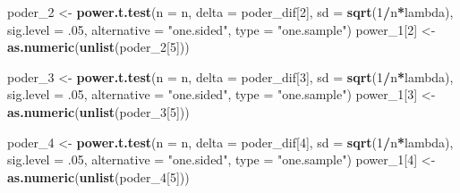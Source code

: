 \documentclass[11pt,]{article}
\newenvironment{Shaded}{\begin{snugshade}}{\end{snugshade}}
\newcommand{\DataTypeTok}[1]{\textcolor[rgb]{0.13,0.29,0.53}{#1}}
\newcommand{\DecValTok}[1]{\textcolor[rgb]{0.00,0.00,0.81}{#1}}
\newcommand{\FloatTok}[1]{\textcolor[rgb]{0.00,0.00,0.81}{#1}}
\newcommand{\KeywordTok}[1]{\textcolor[rgb]{0.13,0.29,0.53}{\textbf{#1}}}
\newcommand{\NormalTok}[1]{#1}
\newcommand{\OperatorTok}[1]{\textcolor[rgb]{0.81,0.36,0.00}{\textbf{#1}}}
\newcommand{\StringTok}[1]{\textcolor[rgb]{0.31,0.60,0.02}{#1}}
\begin{document}
\begin{Shaded}
\begin{Highlighting}[]
\NormalTok{  poder_}\DecValTok{2}\NormalTok{ <-}\StringTok{ }\KeywordTok{power.t.test}\NormalTok{(}\DataTypeTok{n =}\NormalTok{ n, }\DataTypeTok{delta =}\NormalTok{ poder_dif[}\DecValTok{2}\NormalTok{],}
                          \DataTypeTok{sd =} \KeywordTok{sqrt}\NormalTok{(}\DecValTok{1}\OperatorTok{/}\NormalTok{n}\OperatorTok{*}\NormalTok{lambda),}
                          \DataTypeTok{sig.level =} \FloatTok{.05}\NormalTok{,}
                          \DataTypeTok{alternative =} \StringTok{"one.sided"}\NormalTok{,}
                          \DataTypeTok{type =} \StringTok{"one.sample"}\NormalTok{)}
\NormalTok{  power_}\DecValTok{1}\NormalTok{[}\DecValTok{2}\NormalTok{] <-}\StringTok{ }\KeywordTok{as.numeric}\NormalTok{(}\KeywordTok{unlist}\NormalTok{(poder_}\DecValTok{2}\NormalTok{[}\DecValTok{5}\NormalTok{]))}

\NormalTok{  poder_}\DecValTok{3}\NormalTok{ <-}\StringTok{ }\KeywordTok{power.t.test}\NormalTok{(}\DataTypeTok{n =}\NormalTok{ n, }\DataTypeTok{delta =}\NormalTok{ poder_dif[}\DecValTok{3}\NormalTok{],}
                          \DataTypeTok{sd =} \KeywordTok{sqrt}\NormalTok{(}\DecValTok{1}\OperatorTok{/}\NormalTok{n}\OperatorTok{*}\NormalTok{lambda),}
                          \DataTypeTok{sig.level =} \FloatTok{.05}\NormalTok{,}
                          \DataTypeTok{alternative =} \StringTok{"one.sided"}\NormalTok{,}
                          \DataTypeTok{type =} \StringTok{"one.sample"}\NormalTok{)}
\NormalTok{  power_}\DecValTok{1}\NormalTok{[}\DecValTok{3}\NormalTok{] <-}\StringTok{ }\KeywordTok{as.numeric}\NormalTok{(}\KeywordTok{unlist}\NormalTok{(poder_}\DecValTok{3}\NormalTok{[}\DecValTok{5}\NormalTok{]))}

\NormalTok{  poder_}\DecValTok{4}\NormalTok{ <-}\StringTok{ }\KeywordTok{power.t.test}\NormalTok{(}\DataTypeTok{n =}\NormalTok{ n, }\DataTypeTok{delta =}\NormalTok{ poder_dif[}\DecValTok{4}\NormalTok{],}
                          \DataTypeTok{sd =} \KeywordTok{sqrt}\NormalTok{(}\DecValTok{1}\OperatorTok{/}\NormalTok{n}\OperatorTok{*}\NormalTok{lambda),}
                          \DataTypeTok{sig.level =} \FloatTok{.05}\NormalTok{,}
                          \DataTypeTok{alternative =} \StringTok{"one.sided"}\NormalTok{,}
                          \DataTypeTok{type =} \StringTok{"one.sample"}\NormalTok{)}
\NormalTok{  power_}\DecValTok{1}\NormalTok{[}\DecValTok{4}\NormalTok{] <-}\StringTok{ }\KeywordTok{as.numeric}\NormalTok{(}\KeywordTok{unlist}\NormalTok{(poder_}\DecValTok{4}\NormalTok{[}\DecValTok{5}\NormalTok{]))}


\end{Highlighting}
\end{Shaded}
\end{document}
